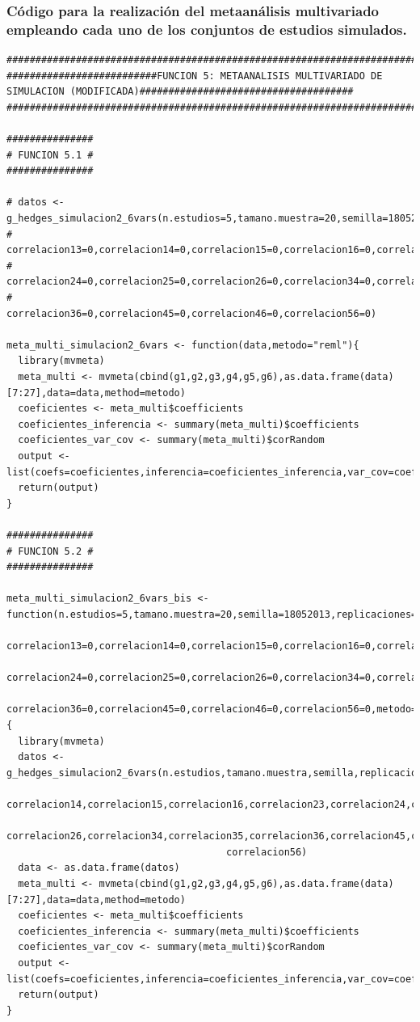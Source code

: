 \documentclass[a4paper,openright,12pt]{report}
\begin{document}
\subsubsection{Código para la realización del metaanálisis multivariado empleando cada uno de los conjuntos de estudios simulados.}
{\tiny
\begin{verbatim}
##############################################################################################################################
##########################FUNCION 5: METAANALISIS MULTIVARIADO DE SIMULACION (MODIFICADA)#####################################
##############################################################################################################################

###############
# FUNCION 5.1 #
###############

# datos <- g_hedges_simulacion2_6vars(n.estudios=5,tamano.muestra=20,semilla=18052013,replicaciones=5,correlacion12=0,
#                                     correlacion13=0,correlacion14=0,correlacion15=0,correlacion16=0,correlacion23=0,
#                                     correlacion24=0,correlacion25=0,correlacion26=0,correlacion34=0,correlacion35=0,
#                                     correlacion36=0,correlacion45=0,correlacion46=0,correlacion56=0)

meta_multi_simulacion2_6vars <- function(data,metodo="reml"){
  library(mvmeta)
  meta_multi <- mvmeta(cbind(g1,g2,g3,g4,g5,g6),as.data.frame(data)[7:27],data=data,method=metodo)
  coeficientes <- meta_multi$coefficients
  coeficientes_inferencia <- summary(meta_multi)$coefficients
  coeficientes_var_cov <- summary(meta_multi)$corRandom
  output <- list(coefs=coeficientes,inferencia=coeficientes_inferencia,var_cov=coeficientes_var_cov)
  return(output)
}

###############
# FUNCION 5.2 #
###############

meta_multi_simulacion2_6vars_bis <- function(n.estudios=5,tamano.muestra=20,semilla=18052013,replicaciones=5,correlacion12=0,
                                             correlacion13=0,correlacion14=0,correlacion15=0,correlacion16=0,correlacion23=0,
                                             correlacion24=0,correlacion25=0,correlacion26=0,correlacion34=0,correlacion35=0,
                                             correlacion36=0,correlacion45=0,correlacion46=0,correlacion56=0,metodo="reml"){
  library(mvmeta)
  datos <- g_hedges_simulacion2_6vars(n.estudios,tamano.muestra,semilla,replicaciones,correlacion12,correlacion13,
                                      correlacion14,correlacion15,correlacion16,correlacion23,correlacion24,correlacion25,
                                      correlacion26,correlacion34,correlacion35,correlacion36,correlacion45,correlacion46,
                                      correlacion56)
  data <- as.data.frame(datos)
  meta_multi <- mvmeta(cbind(g1,g2,g3,g4,g5,g6),as.data.frame(data)[7:27],data=data,method=metodo)
  coeficientes <- meta_multi$coefficients
  coeficientes_inferencia <- summary(meta_multi)$coefficients
  coeficientes_var_cov <- summary(meta_multi)$corRandom
  output <- list(coefs=coeficientes,inferencia=coeficientes_inferencia,var_cov=coeficientes_var_cov)
  return(output)  
}


\end{verbatim}}
\end{document}

